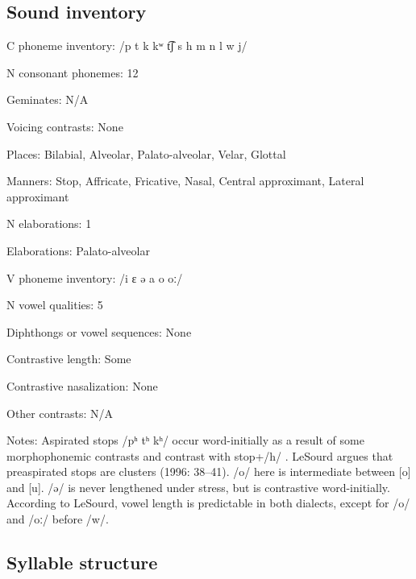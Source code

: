 {\subsection*{Sound inventory}
\begin{appendixdesc}

\item[C phoneme inventory:] /p t k kʷ t͡ʃ s h m n l w j/

\item[N consonant phonemes:] 12

\item[Geminates:] N/A

\item[Voicing contrasts:] None

\item[Places:] Bilabial, Alveolar, Palato-alveolar, Velar, Glottal

\item[Manners:] Stop, Affricate, Fricative, Nasal, Central approximant, Lateral approximant

\item[N elaborations:] 1

\item[Elaborations:] Palato-alveolar

\item[V phoneme inventory:] /i ɛ ə a o oː/

\item[N vowel qualities:] 5

\item[Diphthongs or vowel sequences:] None

\item[Contrastive length:] Some

\item[Contrastive nasalization:] None

\item[Other contrasts:] N/A

\item[Notes:] Aspirated stops /pʰ tʰ kʰ/ occur word-initially as a result of some morphophonemic contrasts and contrast with stop+/h/ \citep{Sherwood1986}. LeSourd argues that preaspirated stops are clusters (1996: 38--41). /o/ here is intermediate between [o] and [u]. /ə/ is never lengthened under stress, but is contrastive word-initially. According to LeSourd, vowel length is predictable in both dialects, except for /o/ and /oː/ before /w/.
\end{appendixdesc}
\subsection*{Syllable structure}
\begin{appendixdesc}


\end{appendixdesc}}
